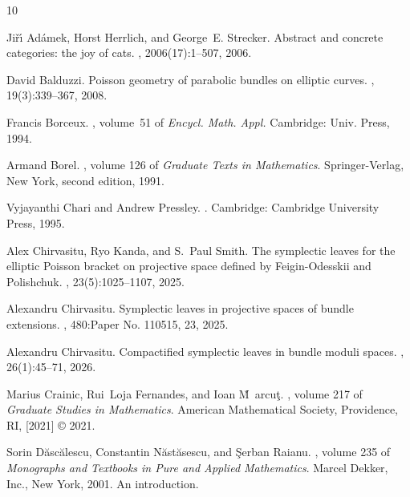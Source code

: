 \documentclass[11pt,leqno]{article}
\theoremstyle{plain}
\theoremstyle{plain}
\theoremstyle{plain}
\numberwithin{equation}{section}
\theoremstyle{nonumberplain}
\newcommand\1{{\bf 1}}
\begin{document}
\def\polhk#1{\setbox0=\hbox{#1}{\ooalign{\hidewidth
  \lower1.5ex\hbox{`}\hidewidth\crcr\unhbox0}}}
\begin{thebibliography}{10}

Ji{\v{r}}{\'{\i}} Ad{\'a}mek, Horst Herrlich, and George~E. Strecker.
\newblock Abstract and concrete categories: the joy of cats.
, 2006(17):1--507, 2006.

David Balduzzi.
\newblock Poisson geometry of parabolic bundles on elliptic curves.
, 19(3):339--367, 2008.

Francis Borceux.
, volume~51 of {\em Encycl. Math. Appl.}
\newblock Cambridge: Univ. Press, 1994.

Armand Borel.
, volume 126 of {\em Graduate Texts in
  Mathematics}.
\newblock Springer-Verlag, New York, second edition, 1991.

Vyjayanthi Chari and Andrew Pressley.
.
\newblock Cambridge: Cambridge University Press, 1995.

Alex Chirvasitu, Ryo Kanda, and S.~Paul Smith.
\newblock The symplectic leaves for the elliptic {P}oisson bracket on
  projective space defined by {F}eigin-{O}desskii and {P}olishchuk.
, 23(5):1025--1107, 2025.

Alexandru Chirvasitu.
\newblock Symplectic leaves in projective spaces of bundle extensions.
, 480:Paper No. 110515, 23, 2025.

Alexandru Chirvasitu.
\newblock Compactified symplectic leaves in bundle moduli spaces.
, 26(1):45--71, 2026.

Marius Crainic, Rui~Loja Fernandes, and Ioan M\u~arcu\c t.
, volume 217 of {\em Graduate
  Studies in Mathematics}.
\newblock American Mathematical Society, Providence, RI, [2021] \copyright
  2021.

Sorin D\u{a}sc\u{a}lescu, Constantin N\u{a}st\u{a}sescu, and \c{S}erban Raianu.
, volume 235 of {\em Monographs and Textbooks in
  Pure and Applied Mathematics}.
\newblock Marcel Dekker, Inc., New York, 2001.
\newblock An introduction.


\end{thebibliography}
\end{document}
